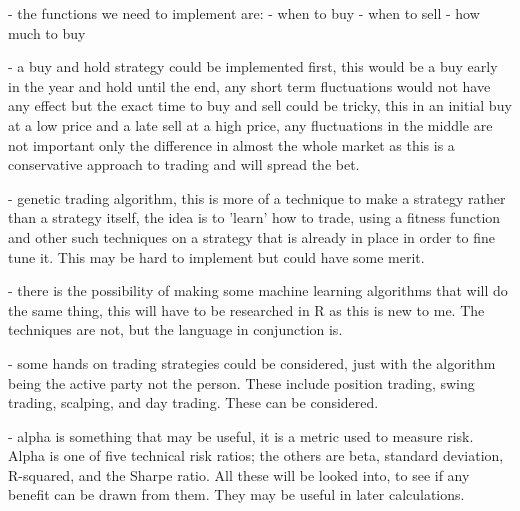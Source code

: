 \documentclass[12pt,a4paper]{article}
\begin{document}
- the functions we need to implement are:
- when to buy
- when to sell
- how much to buy

- a buy and hold strategy could be implemented first, this would be a buy early in the year and hold until the end, any short term fluctuations would not have any effect but the exact time to buy and sell could be tricky, this in an initial buy at a low price and a late sell at a high price, any fluctuations in the middle are not important only the difference in almost the whole market as this is a conservative approach to trading and will spread the bet.

- genetic trading algorithm, this is more of a technique to make a strategy rather than a strategy itself, the idea is to 'learn' how to trade, using a fitness function and other such techniques on a strategy that is already in place in order to fine tune it. This may be hard to implement but could have some merit.

- there is the possibility of making some machine learning algorithms that will do the same thing, this will have to be researched in R as this is new to me. The techniques are not, but the language in conjunction is.

- some hands on trading strategies could be considered, just with the algorithm being the active party not the person. These include position trading, swing trading, scalping, and day trading. These can be considered.

- alpha is something that may be useful, it is a metric used to measure risk. Alpha is one of five technical risk ratios; the others are beta, standard deviation, R-squared, and the Sharpe ratio. All these will be looked into, to see if any benefit can be drawn from them. They may be useful in later calculations.
\fi
\end{document}
